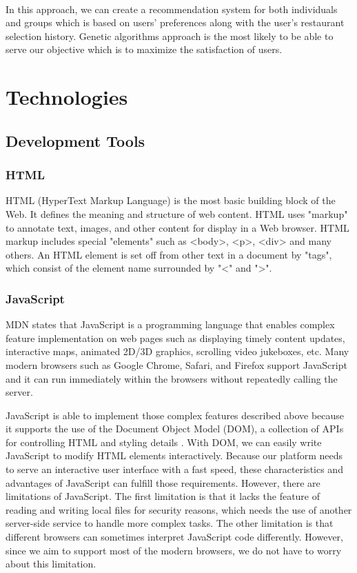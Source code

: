 \documentclass[12pt,oneside,openright,a4paper]{cpe-english-project}
\begin{document}
\

In this approach, we can create a recommendation system for both individuals and groups which is based on users’ preferences along with the user's restaurant selection history. Genetic algorithms approach is the most likely to be able to serve our objective which is to maximize the satisfaction of users.




\section{Technologies}

\subsection{Development Tools}

\subsubsection{HTML}

HTML (HyperText Markup Language) is the most basic building block of the Web. It defines the meaning and structure of web content. HTML uses "markup" to annotate text, images, and other content for display in a Web browser. HTML markup includes special "elements" such as <body>, <p>, <div> and many others. An HTML element is set off from other text in a document by "tags", which consist of the element name surrounded by "<" and ">". \cite{HTMLHyperTextMarkupLanguage}

\subsubsection{JavaScript}

MDN \cite{JavaScript} states that JavaScript is a programming language that enables complex feature implementation on web pages such as displaying timely content updates, interactive maps, animated 2D/3D graphics, scrolling video jukeboxes, etc. Many modern browsers such as Google Chrome, Safari, and Firefox support JavaScript and it can run immediately within the browsers without repeatedly calling the server.

JavaScript is able to implement those complex features described above because it supports the use of the Document Object Model (DOM), a collection of APIs for controlling HTML and styling details \cite{Manipulatingdocuments}. With DOM, we can easily write JavaScript to modify HTML elements interactively.
Because our platform needs to serve an interactive user interface with a fast speed, these characteristics and advantages of JavaScript can fulfill those requirements. However, there are limitations of JavaScript. The first limitation is that it lacks the feature of reading and writing local files for security reasons, which needs the use of another server-side service to handle more complex tasks. The other limitation is that different browsers can sometimes interpret JavaScript code differently. However, since we aim to support most of the modern browsers, we do not have to worry about this limitation.
\end{document}

